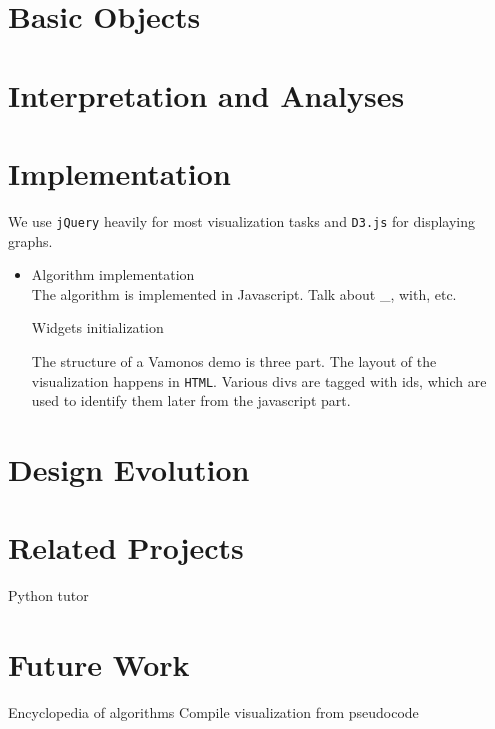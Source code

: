 \documentclass[12pt]{article}
\newcommand{\prog}[1]{{\small\texttt{#1}}}
\begin{document}
\section{Basic Objects}
\label{sec:objects}

\section{Interpretation and Analyses}
\label{sec:analysis}

\section{Implementation}
\label{sec:implementation}

We use \prog{jQuery} heavily for most visualization tasks and \prog{D3.js} for displaying graphs.

\begin{itemize}
\item Algorithm implementation\\
  The algorithm is implemented in Javascript. Talk about _, with, etc.

Widgets initialization

The structure of a Vamonos demo is three part. The layout of the visualization happens in
\prog{HTML}. Various divs are tagged with ids, which are used to identify them later from the
javascript part.
\end{itemize}

\section{Design Evolution}
\label{sec:evol}



\section{Related Projects}
\label{sec:related}

Python tutor

\section{Future Work}
\label{sec:future}

Encyclopedia of algorithms
Compile visualization from pseudocode
\end{document}
